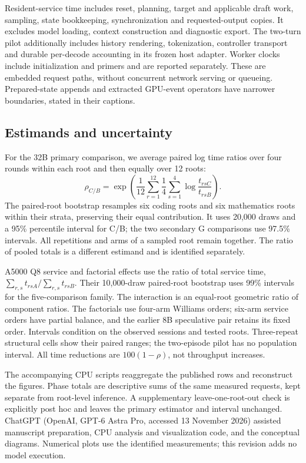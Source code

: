 Resident-service time includes reset, planning, target and applicable draft work, sampling, state bookkeeping, synchronization and requested-output copies. It excludes model loading, context construction and diagnostic export. The two-turn pilot additionally includes history rendering, tokenization, controller transport and durable per-decode accounting in its frozen host adapter. Worker clocks include initialization and primers and are reported separately. These are embedded request paths, without concurrent network serving or queueing. Prepared-state appends and extracted GPU-event operators have narrower boundaries, stated in their captions.

\subsection{Estimands and uncertainty}
For the 32B primary comparison, we average paired log time ratios over four rounds within each root and then equally over 12 roots:
\begin{equation}
 \rho_{C/B}=\exp\!\left(\frac{1}{12}\sum_{r=1}^{12}
 \frac{1}{4}\sum_{s=1}^{4}\log\frac{t_{rsC}}{t_{rsB}}\right).
 \label{eq:s3-estimand}
\end{equation}
The paired-root bootstrap resamples six coding roots and six mathematics roots within their strata, preserving their equal contribution. It uses 20,000 draws and a 95\% percentile interval for C/B; the two secondary G comparisons use 97.5\% intervals. All repetitions and arms of a sampled root remain together. The ratio of pooled totals is a different estimand and is identified separately.

A5000 Q8 service and factorial effects use the ratio of total service time, $\sum_{r,s}t_{rsA}/\sum_{r,s}t_{rsB}$. Their 10,000-draw paired-root bootstrap uses 99\% intervals for the five-comparison family. The interaction is an equal-root geometric ratio of component ratios. The factorials use four-arm Williams orders; six-arm service orders have partial balance, and the earlier 8B speculative pair retains its fixed order. Intervals condition on the observed sessions and tested roots. Three-repeat structural cells show their paired ranges; the two-episode pilot has no population interval. All time reductions are $100(1-\rho)$, not throughput increases.

The accompanying CPU scripts reaggregate the published rows and reconstruct the figures. Phase totals are descriptive sums of the same measured requests, kept separate from root-level inference. A supplementary leave-one-root-out check is explicitly post hoc and leaves the primary estimator and interval unchanged. ChatGPT (OpenAI, GPT-6 Astra Pro, accessed 13 November 2026) assisted manuscript preparation, CPU analysis and visualization code, and the conceptual diagrams. Numerical plots use the identified measurements; this revision adds no model execution.
